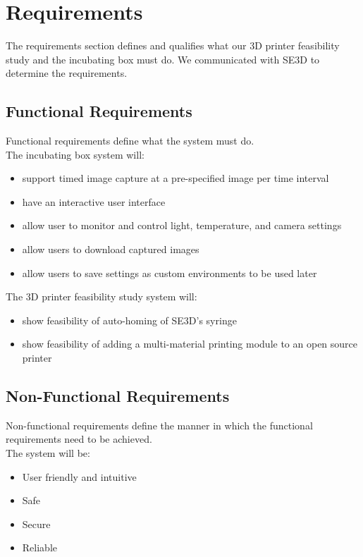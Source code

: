 \chapter{Requirements}

The requirements section defines and qualifies what our 3D printer feasibility study and the incubating box must do. We communicated with SE3D to determine the requirements.

\section{Functional Requirements}

Functional requirements define what the system must do. \\
The incubating box system will:
\begin{itemize}
	\item support timed image capture at a pre-specified image per time interval
	\item have an interactive user interface
	\item allow user to monitor and control light, temperature, and camera settings
	\item allow users to download captured images
	\item allow users to save settings as custom environments to be used later
\end{itemize}



The 3D printer feasibility study system will:
\begin{itemize}
	\item show feasibility of auto-homing of SE3D's syringe 
	\item show feasibility of adding a multi-material printing module to an open source printer
\end{itemize}



\section{Non-Functional Requirements}
Non-functional requirements define the manner in which the functional requirements need to be achieved. \\
The system will be:
\begin{itemize}
	\item User friendly and intuitive
	\item Safe
	\item Secure
	\item Reliable
\end{itemize} 


